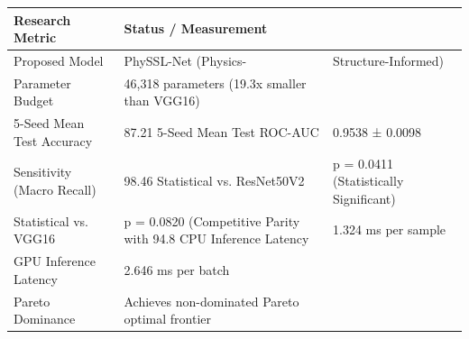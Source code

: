 \begin{tabular}{ll}
\toprule
Research Metric & Status / Measurement \\
\midrule
Proposed Model & PhySSL-Net (Physics- & Structure-Informed) \\
Parameter Budget & 46,318 parameters (19.3x smaller than VGG16) \\
5-Seed Mean Test Accuracy & 87.21%
5-Seed Mean Test ROC-AUC & 0.9538 ± 0.0098 \\
Sensitivity (Macro Recall) & 98.46%
Statistical vs. ResNet50V2 & p = 0.0411 (Statistically Significant) \\
Statistical vs. VGG16 & p = 0.0820 (Competitive Parity with 94.8%
CPU Inference Latency & 1.324 ms per sample \\
GPU Inference Latency & 2.646 ms per batch \\
Pareto Dominance & Achieves non-dominated Pareto optimal frontier \\
\bottomrule
\end{tabular}
